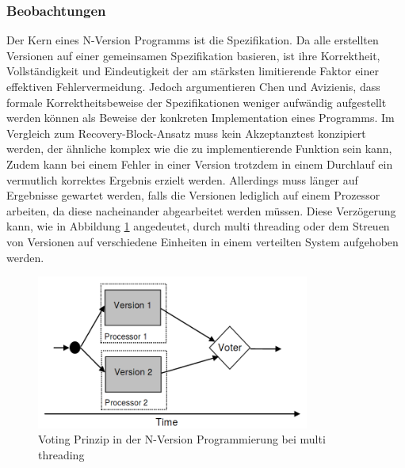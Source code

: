 \subsubsection{Beobachtungen}
Der Kern eines N-Version Programms ist die Spezifikation.
Da alle erstellten Versionen auf einer gemeinsamen Spezifikation basieren, ist ihre Korrektheit, Vollständigkeit und Eindeutigkeit der am stärksten limitierende Faktor einer effektiven Fehlervermeidung.
Jedoch argumentieren Chen und Avizienis, dass formale Korrektheitsbeweise der Spezifikationen weniger aufwändig aufgestellt werden können als Beweise der konkreten Implementation eines Programms.
Im Vergleich zum Recovery-Block-Ansatz muss kein Akzeptanztest konzipiert werden, der ähnliche komplex wie die zu implementierende Funktion sein kann, Zudem kann bei einem Fehler in einer Version trotzdem in einem Durchlauf ein vermutlich korrektes Ergebnis erzielt werden. Allerdings muss länger auf Ergebnisse gewartet werden, falls die Versionen lediglich auf einem Prozessor arbeiten, da diese nacheinander abgearbeitet werden müssen. Diese Verzögerung kann, wie in Abbildung \ref{graph-n-version-multi} angedeutet, durch multi threading oder dem Streuen von Versionen auf verschiedene Einheiten in einem verteilten System aufgehoben werden.
%
\begin{figure}[ht]
	\centering
	\includegraphics[width=0.8\textwidth,natwidth=901,natheight=333]{grafiken/multi-thread-n-version.png}
	\caption{Voting Prinzip in der N-Version Programmierung bei multi threading \cite{lucent}}
	\label{graph-n-version-multi}
\end{figure}
%
